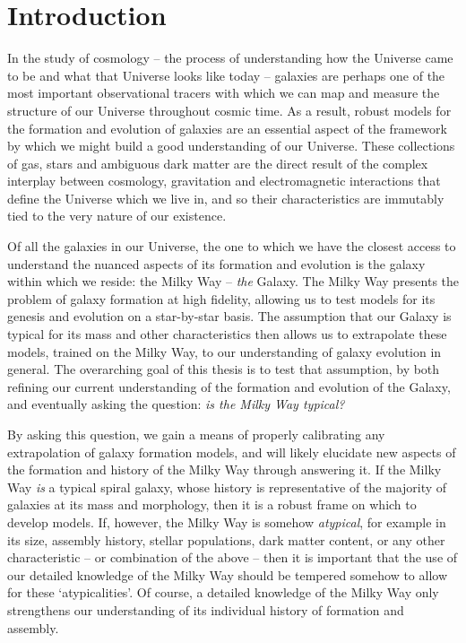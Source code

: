 \chapter{Introduction}
\label{chapter:intro}
In the study of cosmology -- the process of understanding how the Universe came to be and what that Universe looks like today -- galaxies are perhaps one of the most important observational tracers with which we can map and measure the structure of our Universe throughout cosmic time. As a result, robust models for the formation and evolution of galaxies are an essential aspect of the framework by which we might build a good understanding of our Universe. These collections of gas, stars and ambiguous dark matter are the direct result of the complex interplay between cosmology, gravitation and electromagnetic interactions that define the Universe which we live in, and so their characteristics are immutably tied to the very nature of our existence.

Of all the galaxies in our Universe, the one to which we have the closest access to understand the nuanced aspects of its formation and evolution is the galaxy within which we reside: the Milky Way -- \emph{the} Galaxy. The Milky Way presents the problem of galaxy formation at high fidelity, allowing us to test models for its genesis and evolution on a star-by-star basis. The assumption that our Galaxy is typical for its mass and other characteristics then allows us to extrapolate these models, trained on the Milky Way, to our understanding of galaxy evolution in general. The overarching goal of this thesis is to test that assumption, by both refining our current understanding of the formation and evolution of the Galaxy, and eventually asking the question: \emph{is the Milky Way typical?}

By asking this question, we gain a means of properly calibrating any extrapolation of galaxy formation models, and will likely elucidate new aspects of the formation and history of the Milky Way through answering it. If the Milky Way \emph{is} a typical spiral galaxy, whose history is representative of the majority of galaxies at its mass and morphology, then it is a robust frame on which to develop models. If, however, the Milky Way is somehow \emph{atypical}, for example in its size, assembly history, stellar populations, dark matter content, or any other characteristic --  or combination of the above -- then it is important that the use of our detailed knowledge of the Milky Way should be tempered somehow to allow for these `atypicalities'. Of course, a detailed knowledge of the Milky Way only strengthens our understanding of its individual history of formation and assembly.


